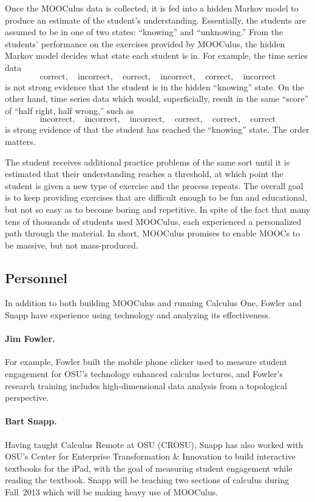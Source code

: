 \documentclass[12pt]{article}
\begin{document}
Once the MOOCulus data is collected, it is fed into a hidden Markov
model to produce an estimate of the student's
understanding. Essentially, the students are assumed to be in one of
two states: ``knowing'' and ``unknowing.''  From the students'
performance on the exercises provided by MOOCulus, the hidden Markov
model decides what state each student is in.  For example, the time series data
$$
\mbox{correct},\quad\mbox{incorrect},\quad\mbox{correct},\quad\mbox{incorrect},\quad\mbox{correct},\quad\mbox{incorrect}
$$
is not strong evidence that the student is in the hidden ``knowing''
state.  On the other hand, time series data which would,
superficially, result in the same ``score'' of ``half right, half wrong,'' such as
$$
\mbox{incorrect},\quad\mbox{incorrect},\quad\mbox{incorrect},\quad\mbox{correct},\quad\mbox{correct},\quad\mbox{correct}
$$
is strong evidence of that the student has reached the ``knowing''
state.  The order matters.

The student receives additional practice problems of the same sort
until it is estimated that their understanding reaches a threshold, at
which point the student is given a new type of exercise and the
process repeats.  The overall goal is to keep providing exercises that
are difficult enough to be fun and educational, but not so easy as to
become boring and repetitive.  In spite of the fact that many tens of
thousands of students used MOOCulus, each experienced a personalized
path through the material.  In short, MOOCulus promises to enable
MOOCs to be massive, but not mass-produced.

\subsection*{Personnel}

In addition to both building MOOCulus and running Calculus One, Fowler
and Snapp have experience using technology and analyzing its
effectiveness.

\paragraph*{Jim Fowler.} For example, Fowler built the mobile phone
clicker used to measure student engagement for OSU's technology
enhanced calculus lectures, and Fowler's research training includes
high-dimensional data analysis from a topological perspective.

\paragraph*{Bart Snapp.} Having taught Calculus Remote at OSU (CROSU),
Snapp has also worked with OSU's Center for Enterprise Transformation
\& Innovation to build interactive textbooks for the iPad, with the
goal of measuring student engagement while reading the textbook.
Snapp will be teaching two sections of calculus during Fall~2013 which
will be making heavy use of MOOCulus.
\end{document}
